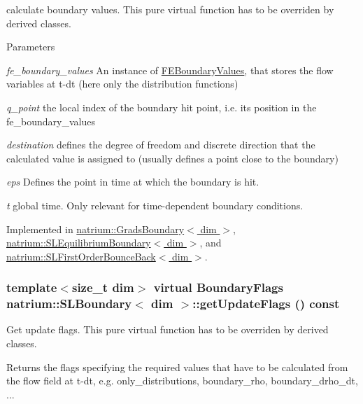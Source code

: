 calculate boundary values. This pure virtual function has to be overriden by derived classes. 
\begin{DoxyParams}{Parameters}
\item[{\em fe\_\-boundary\_\-values}]An instance of \hyperlink{classnatrium_1_1FEBoundaryValues}{FEBoundaryValues}, that stores the flow variables at t-\/dt (here only the distribution functions) \item[{\em q\_\-point}]the local index of the boundary hit point, i.e. its position in the fe\_\-boundary\_\-values \item[{\em destination}]defines the degree of freedom and discrete direction that the calculated value is assigned to (usually defines a point close to the boundary) \item[{\em eps}]Defines the point in time at which the boundary is hit. \item[{\em t}]global time. Only relevant for time-\/dependent boundary conditions. \end{DoxyParams}


Implemented in \hyperlink{classnatrium_1_1GradsBoundary_a66b6623d5701b3a8e40d3527412e37df}{natrium::GradsBoundary$<$ dim $>$}, \hyperlink{classnatrium_1_1SLEquilibriumBoundary_a25ba9ab8c3263043b158e913d130bd2d}{natrium::SLEquilibriumBoundary$<$ dim $>$}, and \hyperlink{classnatrium_1_1SLFirstOrderBounceBack_a0ff05e7fd8cd657f77fd9636c7a55e60}{natrium::SLFirstOrderBounceBack$<$ dim $>$}.\hypertarget{classnatrium_1_1SLBoundary_ad2b9a7f797b3af9b6493f9e9c5da5434}{
\subsubsection[{getUpdateFlags}]{\setlength{\rightskip}{0pt plus 5cm}template$<$size\_\-t dim$>$ virtual {\bf BoundaryFlags} {\bf natrium::SLBoundary}$<$ dim $>$::getUpdateFlags () const}}
\label{classnatrium_1_1SLBoundary_ad2b9a7f797b3af9b6493f9e9c5da5434}


Get update flags. This pure virtual function has to be overriden by derived classes. \begin{DoxyReturn}{Returns}
the flags specifying the required values that have to be calculated from the flow field at t-\/dt, e.g. only\_\-distributions, boundary\_\-rho, boundary\_\-drho\_\-dt, ... 
\end{DoxyReturn}



